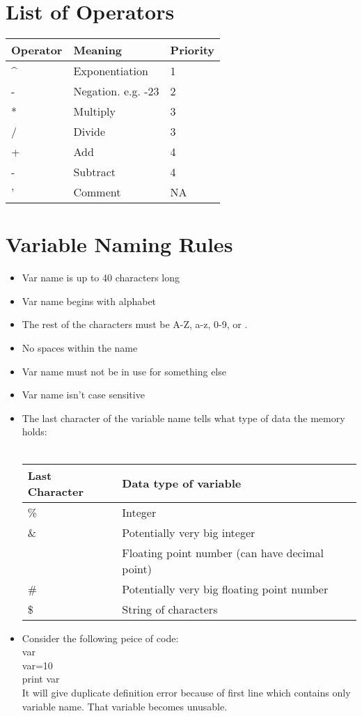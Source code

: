 \documentclass[a4paper,11pt]{article}
\begin{document}
 \pagebreak
 
 \section{\color{red}List of Operators}

 \begin{tabular}{| l | l | l |}
  \hline
  \textbf{Operator} & \textbf{Meaning} & \textbf{Priority} \\  \hline
  \^{} & Exponentiation & 1 \\  \hline
  - & Negation. e.g. -23 & 2 \\  \hline
  * & Multiply & 3 \\  \hline
  / & Divide & 3 \\  \hline
  + & Add & 4 \\  \hline
  - & Subtract & 4 \\  \hline
  ' & Comment & NA \\  \hline
  
 \end{tabular}
 \section{\color{red}Variable Naming Rules}
 \begin{itemize}
  \item Var name is up to 40 characters long
  \item Var name begins with alphabet
  \item The rest of the characters must be A-Z, a-z, 0-9, or .
  \item No spaces within the name
  \item Var name must not be in use for something else
  \item Var name isn't case sensitive
  \item The last character of the variable name tells what type of data the memory holds:\\ \\
  \begin{tabular}{| l | l |}
    \hline
    \textbf{Last Character} & \textbf{Data type of variable} \\ \hline
    \% & Integer \\ \hline
    \& & Potentially very big integer \\ \hline
    [No Special symbol] & Floating point number (can have decimal point) \\ \hline
    \# & Potentially very big floating point number \\ \hline
    \$ & String of characters \\ \hline
  \end{tabular}

  \item Consider the following peice of code:\\var\\var=10\\print var\\It will give duplicate definition error because of first line which contains only variable name. That variable becomes unusable.
 \end{itemize}
\end{document}
